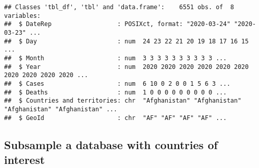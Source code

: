 \documentclass[]{article}
\newenvironment{Shaded}{\begin{snugshade}}{\end{snugshade}}
\newcommand{\CommentTok}[1]{\textcolor[rgb]{0.56,0.35,0.01}{\textit{#1}}}
\newcommand{\DataTypeTok}[1]{\textcolor[rgb]{0.13,0.29,0.53}{#1}}
\newcommand{\KeywordTok}[1]{\textcolor[rgb]{0.13,0.29,0.53}{\textbf{#1}}}
\newcommand{\NormalTok}[1]{#1}
\newcommand{\OperatorTok}[1]{\textcolor[rgb]{0.81,0.36,0.00}{\textbf{#1}}}
\newcommand{\StringTok}[1]{\textcolor[rgb]{0.31,0.60,0.02}{#1}}
\begin{document}
\begin{verbatim}
## Classes 'tbl_df', 'tbl' and 'data.frame':    6551 obs. of  8 variables:
##  $ DateRep                  : POSIXct, format: "2020-03-24" "2020-03-23" ...
##  $ Day                      : num  24 23 22 21 20 19 18 17 16 15 ...
##  $ Month                    : num  3 3 3 3 3 3 3 3 3 3 ...
##  $ Year                     : num  2020 2020 2020 2020 2020 2020 2020 2020 2020 2020 ...
##  $ Cases                    : num  6 10 0 2 0 0 1 5 6 3 ...
##  $ Deaths                   : num  1 0 0 0 0 0 0 0 0 0 ...
##  $ Countries and territories: chr  "Afghanistan" "Afghanistan" "Afghanistan" "Afghanistan" ...
##  $ GeoId                    : chr  "AF" "AF" "AF" "AF" ...
\end{verbatim}

\hypertarget{subsample-a-database-with-countries-of-interest}{%
\subsection{Subsample a database with countries of
interest}\label{subsample-a-database-with-countries-of-interest}}

\begin{Shaded}
\end{Shaded}
\end{document}
